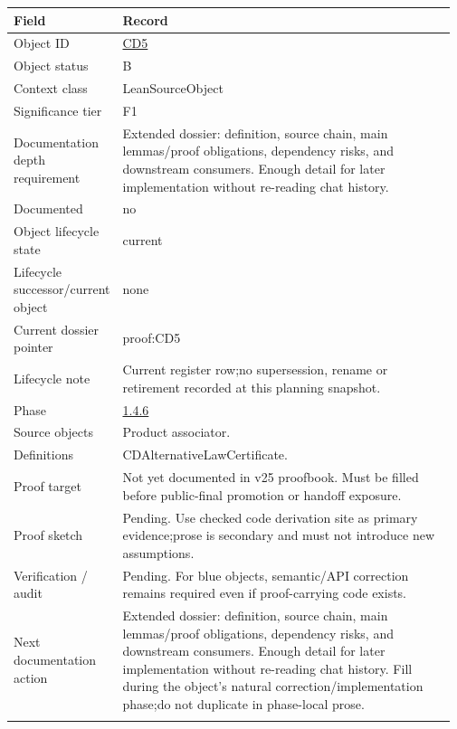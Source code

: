 \begin{longtable}{L{0.16\linewidth} L{0.81\linewidth}}
\hline
\textbf{Field} & \textbf{Record}\\
\hline
Object ID & \hyperlink{object-row-CD5}{CD5}\\
\hline\addlinespace[0.20em]
Object status & B\\
\hline\addlinespace[0.20em]
Context class & LeanSourceObject\\
\hline\addlinespace[0.20em]
Significance tier & F1\\
\hline\addlinespace[0.20em]
Documentation depth requirement & Extended dossier: definition, source chain, main lemmas/\allowbreak{}proof obligations, dependency risks, and downstream consumers. Enough detail for later implementation without re-reading chat history.\\
\hline\addlinespace[0.20em]
Documented & no\\
\hline\addlinespace[0.20em]
Object lifecycle state & current\\
\hline\addlinespace[0.20em]
Lifecycle successor/\allowbreak{}current object & none\\
\hline\addlinespace[0.20em]
Current dossier pointer & proof:CD5\\
\hline\addlinespace[0.20em]
Lifecycle note & Current register row;\newline no supersession, rename or retirement recorded at this planning snapshot.\\
\hline\addlinespace[0.20em]
Phase & \hyperlink{phase-row-1-4-6}{1.4.6}\\
\hline\addlinespace[0.20em]
Source objects & Product associator.\\
\hline\addlinespace[0.20em]
Definitions & CDAlternativeLawCertificate.\\
\hline\addlinespace[0.20em]
Proof target & Not yet documented in v25 proofbook. Must be filled before public-final promotion or handoff exposure.\\
\hline\addlinespace[0.20em]
Proof sketch & Pending. Use checked code derivation site as primary evidence;\newline prose is secondary and must not introduce new assumptions.\\
\hline\addlinespace[0.20em]
Verification /\allowbreak{} audit & Pending. For blue objects, semantic/\allowbreak{}API correction remains required even if proof-carrying code exists.\\
\hline\addlinespace[0.20em]
Next documentation action & Extended dossier: definition, source chain, main lemmas/\allowbreak{}proof obligations, dependency risks, and downstream consumers. Enough detail for later implementation without re-reading chat history. Fill during the object's natural correction/\allowbreak{}implementation phase;\newline do not duplicate in phase-local prose.\\
\hline\addlinespace[0.20em]
\end{longtable}
